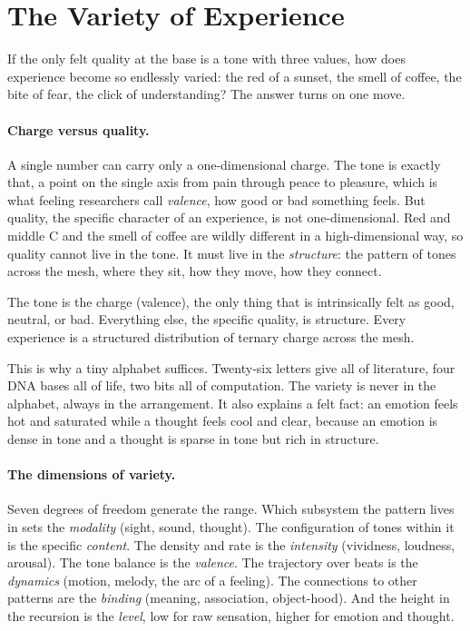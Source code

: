 \section{The Variety of Experience}
\label{sec:experience}

If the only felt quality at the base is a tone with three values, how does experience become
so endlessly varied: the red of a sunset, the smell of coffee, the bite of fear, the click of
understanding? The answer turns on one move.

\paragraph{Charge versus quality.}
A single number can carry only a one-dimensional charge. The tone is exactly that, a point on
the single axis from pain through peace to pleasure, which is what feeling researchers call
\emph{valence}, how good or bad something feels. But quality, the specific character of an
experience, is not one-dimensional. Red and middle C and the smell of coffee are wildly
different in a high-dimensional way, so quality cannot live in the tone. It must live in the
\emph{structure}: the pattern of tones across the mesh, where they sit, how they move, how
they connect.

\begin{principle}
The tone is the charge (valence), the only thing that is intrinsically felt as good, neutral,
or bad. Everything else, the specific quality, is structure. Every experience is a structured
distribution of ternary charge across the mesh.
\end{principle}

This is why a tiny alphabet suffices. Twenty-six letters give all of literature, four DNA
bases all of life, two bits all of computation. The variety is never in the alphabet, always
in the arrangement. It also explains a felt fact: an emotion feels hot and saturated while a
thought feels cool and clear, because an emotion is dense in tone and a thought is sparse in
tone but rich in structure.

\paragraph{The dimensions of variety.}
Seven degrees of freedom generate the range. Which subsystem the pattern lives in sets the
\emph{modality} (sight, sound, thought). The configuration of tones within it is the specific
\emph{content}. The density and rate is the \emph{intensity} (vividness, loudness, arousal).
The tone balance is the \emph{valence}. The trajectory over beats is the \emph{dynamics}
(motion, melody, the arc of a feeling). The connections to other patterns are the
\emph{binding} (meaning, association, object-hood). And the height in the recursion is the
\emph{level}, low for raw sensation, higher for emotion and thought.

